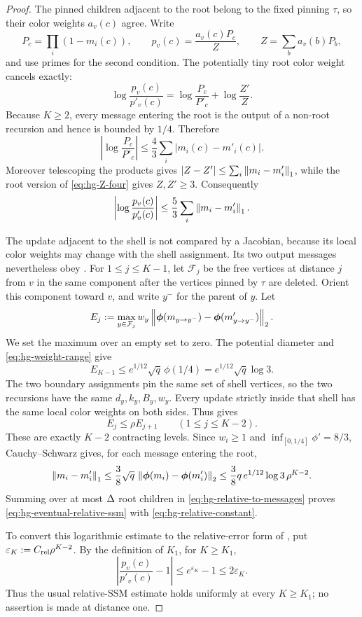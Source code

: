 \begin{proof}
The pinned children adjacent to the root belong to the fixed pinning $\tau$,
so their color weights \(a_v(c)\) agree.  Write
\[
 P_c=\prod_i(1-m_i(c)),\qquad
 p_v(c)=\frac{a_v(c)P_c}{Z},\qquad
 Z=\sum_b a_v(b)P_b,
\]
and use primes for the second condition.  The potentially tiny root color
weight cancels exactly:
\begin{equation}
 \log\frac{p_v(c)}{p'_v(c)}
 =\log\frac{P_c}{P'_c}+\log\frac{Z'}Z.
 \label{eq:hg-palette-cancellation}
\end{equation}
Because $K\ge2$, every message entering the root is the output of a non-root
recursion and hence is bounded by $1/4$.  Therefore
\[
 \left|\log\frac{P_c}{P'_c}\right|
 \le\frac43\sum_i|m_i(c)-m'_i(c)|.
\]
Moreover telescoping the products gives
$|Z-Z'|\le\sum_i\left\|m_i-m'_i\right\|_1$, while the root version of
\eqref{eq:hg-Z-four} gives $Z,Z'\ge3$.  Consequently
\begin{equation}
 \left|\log\frac{p_v(c)}{p'_v(c)}\right|
 \le\frac53\sum_i\left\|m_i-m'_i\right\|_1.
 \label{eq:hg-relative-to-messages}
\end{equation}

The update adjacent to the shell is not compared by a Jacobian, because its
local color weights may change with the shell assignment.  Its two output
messages nevertheless obey .  For
\(1\le j\le K-1\), let \(\mathcal F_j\) be the free vertices at distance
\(j\) from \(v\) in the same component after the vertices pinned by
\(\tau\) are deleted.  Orient this component toward \(v\), and write
\(y^-\) for the parent of \(y\).  Let
\[
 E_j:=
 \max_{y\in\mathcal F_j}
 w_y\left\|\boldsymbol\phi(m_{y\to y^-})
             -\boldsymbol\phi(m'_{y\to y^-})\right\|_2 .
\]
We set the maximum over an empty set to zero.
The potential diameter and \eqref{eq:hg-weight-range} give
\[
 E_{K-1}\le e^{1/12}\sqrt q\,\phi(1/4)
 =e^{1/12}\sqrt q\log3.
\]
The two boundary assignments pin the same set of shell vertices, so the two
recursions have the same \(d_y,k_y,B_y,w_y\).  Every update strictly inside
that shell has the same local color weights on both sides.  Thus
 gives
\[
 E_j\le\rho E_{j+1}
 \qquad(1\le j\le K-2).
\]
These are exactly \(K-2\) contracting levels.  Since \(w_i\ge1\) and
\(\inf_{[0,1/4]}\phi'=8/3\), Cauchy--Schwarz gives, for each message entering
the root,
\[
 \left\|m_i-m'_i\right\|_1
 \le\frac38\sqrt q\,
       \left\|\boldsymbol\phi(m_i)-\boldsymbol\phi(m'_i)\right\|_2
 \le\frac38q\,e^{1/12}\log3\,\rho^{K-2}.
\]
Summing over at most \(\Delta\) root children in
\eqref{eq:hg-relative-to-messages} proves
\eqref{eq:hg-eventual-relative-ssm} with
\eqref{eq:hg-relative-constant}.

To convert this logarithmic estimate to the relative-error form of
\cite[Definition~5.7]{CLMM2023}, put
\(\varepsilon_K:=C_{\rm rel}\rho^{K-2}\).  By the definition of \(K_1\), for
\(K\ge K_1\),
\[
 \left|\frac{p_v(c)}{p'_v(c)}-1\right|
 \le e^{\varepsilon_K}-1\le2\varepsilon_K .
\]
Thus the usual relative-SSM estimate holds uniformly at every
$K\ge K_1$; no assertion is made at distance one.
\end{proof}

